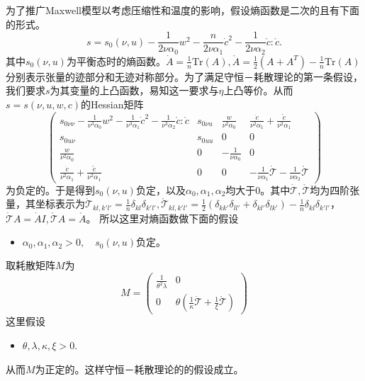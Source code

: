 	为了推广Maxwell模型以考虑压缩性和温度的影响，假设熵函数是二次的且有下面的形式。
	\begin{equation}\label{eq:entropyf}
		s = s_0(\nu,u)  - \frac{1}{2\nu \alpha_0} w^2 - \frac{n}{2\nu \alpha_1} \dot{c}^2- \frac{1}{2\nu\alpha_2 } \mathring{c}:\mathring{c}.
	\end{equation}
	其中$s_0(\nu,u)$为平衡态时的熵函数。$\dot{A} = \frac{1}{n} \mbox{Tr} (A), \mathring{A} = \frac{1}{2} (A + A^T) - \frac{1}{n} \mbox{Tr} (A) $分别表示张量的迹部分和无迹对称部分。为了满足守恒－耗散理论的第一条假设，我们要求$s$为其变量的上凸函数，易知这一要求与$\eta$上凸等价。从而$s=s(\nu,u,w,c)$的Hessian矩阵
	\begin{equation*}
		\left(    \begin{array}{cccc}
			s_{0\nu\nu} - \frac{1}{\nu^3 \alpha_0} w^2 - \frac{1}{\nu^3 \alpha_1} \dot{c}^2- \frac{1}{\nu^3 \alpha_2} \mathring{c}:\mathring{c} & s_{0\nu u} & \frac{w}{\nu^2 \alpha_0} & \frac{\dot{c}}{\nu^2 \alpha_1} + \frac{\mathring{c}}{\nu^2 \alpha_1} \\
			s_{0u\nu} & s_{0uu} & 0 & 0 \\
			\frac{w}{\nu^2\alpha_0} & 0 & -\frac{1}{\nu \alpha_0} & 0 \\
			\frac{\dot{c}}{\nu^2 \alpha_1} + \frac{\mathring{c}}{\nu^2 \alpha_1} & 0 & 0 & -\frac{1}{\nu \alpha_1} \dot{\mathcal{T}}  -\frac{1}{\nu \alpha_2} \mathring{\mathcal{T}} 
		\end{array} \right)
	\end{equation*}
	为负定的。于是得到$s_0(\nu,u)$负定，以及$\alpha_0,\alpha_1,\alpha_2$均大于$0$。其中$\dot{\mathcal{T}}, \mathring{\mathcal{T}}$均为四阶张量，其坐标表示为$\dot{\mathcal{T}}_{kl,k'l'} = \frac{1}{n}\delta_{kl} \delta_{k'l'}, \mathring{\mathcal{T}}_{kl,k'l'} =\frac{1}{2}(\delta_{kk'}\delta_{ll'} + \delta_{kl'} \delta_{lk'} ) -\frac{1}{n}\delta_{kl} \delta_{k'l'} $，$\dot{\mathcal{T}} A = \dot{A} I,\mathring{\mathcal{T}} A = \mathring{A}$。
	所以这里对熵函数做下面的假设
	\begin{itemize}
		\item $\alpha_0,\alpha_1,\alpha_2>0, \quad s_0(\nu,u) \text{负定。}$
	\end{itemize}

	取耗散矩阵$M$为
	\begin{equation*}
		M = \left( \begin{array}{ccc} 
			\frac{1}{\theta^2 \lambda} & 0 \\
			0 &  \theta(\frac{1}{\kappa} \dot{\mathcal{T}} + \frac{1}{\xi} \mathring{\mathcal{T}})  
		\end{array} \right)
	\end{equation*}
	这里假设
	\begin{itemize}
		\item $\theta,\lambda,\kappa,\xi > 0$.
	\end{itemize}
	从而$M$为正定的。这样守恒－耗散理论的的假设成立。

